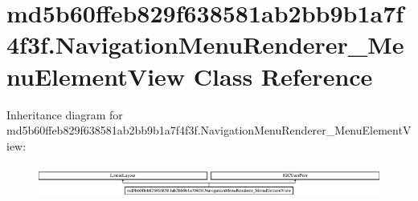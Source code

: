 \hypertarget{classmd5b60ffeb829f638581ab2bb9b1a7f4f3f_1_1NavigationMenuRenderer__MenuElementView}{}\section{md5b60ffeb829f638581ab2bb9b1a7f4f3f.\+Navigation\+Menu\+Renderer\+\_\+\+Menu\+Element\+View Class Reference}
\label{classmd5b60ffeb829f638581ab2bb9b1a7f4f3f_1_1NavigationMenuRenderer__MenuElementView}
Inheritance diagram for md5b60ffeb829f638581ab2bb9b1a7f4f3f.\+Navigation\+Menu\+Renderer\+\_\+\+Menu\+Element\+View\+:\begin{figure}[H]
\begin{center}
\leavevmode
\includegraphics[height=1.100196cm]{classmd5b60ffeb829f638581ab2bb9b1a7f4f3f_1_1NavigationMenuRenderer__MenuElementView}
\end{center}
\end{figure}
